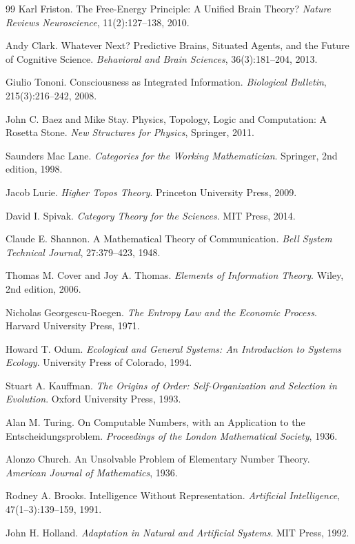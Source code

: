 \documentclass[11pt]{article}
\theoremstyle{plain}
\theoremstyle{definition}
\theoremstyle{remark}
\begin{document}
\begin{thebibliography}{99}
Karl Friston.
The Free-Energy Principle: A Unified Brain Theory?
\textit{Nature Reviews Neuroscience}, 11(2):127--138, 2010.

Andy Clark.
Whatever Next? Predictive Brains, Situated Agents, and the Future of Cognitive Science.
\textit{Behavioral and Brain Sciences}, 36(3):181--204, 2013.

Giulio Tononi.
Consciousness as Integrated Information.
\textit{Biological Bulletin}, 215(3):216--242, 2008.

John C. Baez and Mike Stay.
Physics, Topology, Logic and Computation: A Rosetta Stone.
\textit{New Structures for Physics}, Springer, 2011.

Saunders Mac Lane.
\textit{Categories for the Working Mathematician}.
Springer, 2nd edition, 1998.

Jacob Lurie.
\textit{Higher Topos Theory}.
Princeton University Press, 2009.

David I. Spivak.
\textit{Category Theory for the Sciences}.
MIT Press, 2014.

Claude E. Shannon.
A Mathematical Theory of Communication.
\textit{Bell System Technical Journal}, 27:379--423, 1948.

Thomas M. Cover and Joy A. Thomas.
\textit{Elements of Information Theory}.
Wiley, 2nd edition, 2006.

Nicholas Georgescu-Roegen.
\textit{The Entropy Law and the Economic Process}.
Harvard University Press, 1971.

Howard T. Odum.
\textit{Ecological and General Systems: An Introduction to Systems Ecology}.
University Press of Colorado, 1994.

Stuart A. Kauffman.
\textit{The Origins of Order: Self-Organization and Selection in Evolution}.
Oxford University Press, 1993.

Alan M. Turing.
On Computable Numbers, with an Application to the Entscheidungsproblem.
\textit{Proceedings of the London Mathematical Society}, 1936.

Alonzo Church.
An Unsolvable Problem of Elementary Number Theory.
\textit{American Journal of Mathematics}, 1936.

Rodney A. Brooks.
Intelligence Without Representation.
\textit{Artificial Intelligence}, 47(1--3):139--159, 1991.

John H. Holland.
\textit{Adaptation in Natural and Artificial Systems}.
MIT Press, 1992.

\end{thebibliography}
\end{document}
